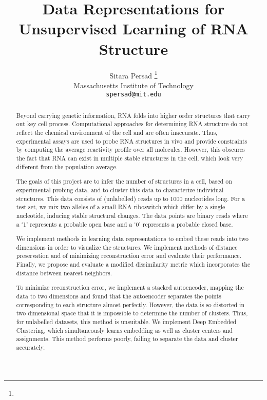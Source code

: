 \documentclass{article}
\title{Data Representations for Unsupervised Learning of RNA Structure}
\author{
	Sitara Persad \thanks{} \\
	Massachusetts Institute of Technology\\
	\texttt{spersad@mit.edu} \\
}
\begin{document}
	
	\maketitle
	
	\begin{abstract}
Beyond carrying genetic information, RNA folds into higher order structures that carry out key cell process. Computational approaches for determining RNA structure do not reflect the chemical environment of the cell and are often inaccurate. Thus, experimental assays are used to probe RNA structures in vivo and provide constraints by computing the average reactivity profile over all molecules. However, this obscures the fact that RNA can exist in multiple stable structures in the cell, which look very different from the population average.

The goals of this project are to infer the number of structures in a cell, based on experimental probing data, and to cluster this data to characterize individual structures. This data consists of (unlabelled) reads up to 1000 nucleotides long. For a test set, we mix two alleles of a small RNA riboswitch which differ by a single nucleotide, inducing stable structural changes. The data points are binary reads where a ‘1’ represents a probable open base and a ‘0’ represents a probable closed base.

We implement methods in learning data representations to embed these reads into two dimensions in order to visualize the structures. We implement methods of distance preservation and of minimizing reconstruction error and evaluate their performance. Finally, we propose and evaluate a modified dissimilarity metric which incorporates the distance between nearest neighbors.

To minimize reconstruction error, we implement a stacked autoencoder, mapping the data to two dimensions and found that the autoencoder separates the points corresponding to each structure almost perfectly. However, the data is so distorted in two dimensional space that it is impossible to determine the number of clusters. Thus, for unlabelled datasets, this method is unsuitable. We implement Deep Embedded Clustering, which simultaneously learns embedding as well as cluster centers and assignments. This method performs poorly, failing to separate the data and cluster accurately.


\end{abstract}
\end{document}
